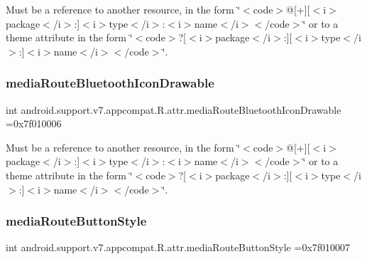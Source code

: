 Must be a reference to another resource, in the form \char`\"{}$<$code$>$@\mbox{[}+\mbox{]}\mbox{[}$<$i$>$package$<$/i$>$\+:\mbox{]}$<$i$>$type$<$/i$>$\+:$<$i$>$name$<$/i$>$$<$/code$>$\char`\"{} or to a theme attribute in the form \char`\"{}$<$code$>$?\mbox{[}$<$i$>$package$<$/i$>$\+:\mbox{]}\mbox{[}$<$i$>$type$<$/i$>$\+:\mbox{]}$<$i$>$name$<$/i$>$$<$/code$>$\char`\"{}. \mbox{\label{classandroid_1_1support_1_1v7_1_1appcompat_1_1R_1_1attr_af0d5cca1e5ef2227e17e2ceff427bc91}} 
\subsubsection{\texorpdfstring{media\+Route\+Bluetooth\+Icon\+Drawable}{mediaRouteBluetoothIconDrawable}}
{\footnotesize\ttfamily int android.\+support.\+v7.\+appcompat.\+R.\+attr.\+media\+Route\+Bluetooth\+Icon\+Drawable =0x7f010006\hspace{0.3cm}{\ttfamily [static]}}

Must be a reference to another resource, in the form \char`\"{}$<$code$>$@\mbox{[}+\mbox{]}\mbox{[}$<$i$>$package$<$/i$>$\+:\mbox{]}$<$i$>$type$<$/i$>$\+:$<$i$>$name$<$/i$>$$<$/code$>$\char`\"{} or to a theme attribute in the form \char`\"{}$<$code$>$?\mbox{[}$<$i$>$package$<$/i$>$\+:\mbox{]}\mbox{[}$<$i$>$type$<$/i$>$\+:\mbox{]}$<$i$>$name$<$/i$>$$<$/code$>$\char`\"{}. \mbox{\label{classandroid_1_1support_1_1v7_1_1appcompat_1_1R_1_1attr_a5c203003009691f3e157455828903bfb}} 
\subsubsection{\texorpdfstring{media\+Route\+Button\+Style}{mediaRouteButtonStyle}}
{\footnotesize\ttfamily int android.\+support.\+v7.\+appcompat.\+R.\+attr.\+media\+Route\+Button\+Style =0x7f010007\hspace{0.3cm}{\ttfamily [static]}}

